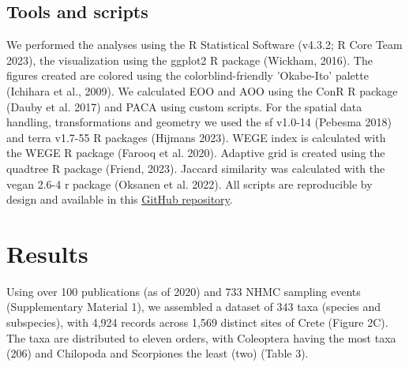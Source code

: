     \subsection{Tools and scripts}
    \label{subsec:arthropods-tools}
We performed the analyses using the R Statistical Software (v4.3.2; R Core Team 2023),
the visualization using the ggplot2 R package (Wickham, 2016). The figures
created are colored using the colorblind-friendly 'Okabe-Ito' palette (Ichihara et al., 2009).
We calculated EOO and AOO using the ConR R package (Dauby et al. 2017) and PACA
using custom scripts. For the spatial data handling, transformations and
geometry we used the sf v1.0-14 (Pebesma 2018) and terra v1.7-55 R packages (Hijmans 2023).
WEGE index is calculated with the WEGE R package (Farooq et al. 2020).
Adaptive grid is created using the quadtree R package (Friend, 2023).
Jaccard similarity was calculated with the vegan 2.6-4 r package (Oksanen et al. 2022).
All scripts are reproducible by design and available in this 
\href{https://github.com/savvas-paragkamian/arthropoda_assessment_crete}{GitHub repository}.

\section{Results}
\label{sec:arthropods-results}

Using over 100 publications (as of 2020) and 733 NHMC sampling events
(Supplementary Material 1), we assembled a dataset of 343 taxa (species and subspecies),
with 4,924 records across 1,569 distinct sites of Crete (Figure 2C). The taxa
are distributed to eleven orders, with Coleoptera having the most taxa (206)
and Chilopoda and Scorpiones the least (two) (Table 3).

